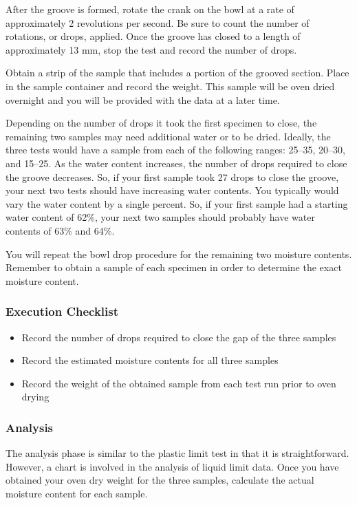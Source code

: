\documentclass[12pt]{article}
\begin{document}
After the groove is formed, rotate the crank on the bowl at a rate of approximately 2 revolutions per second. Be sure to count the number of rotations, or drops, applied. Once the groove has closed to a length of approximately 13 mm, stop the test and record the number of drops.

Obtain a strip of the sample that includes a portion of the grooved section. Place in the sample container and record the weight. This sample will be oven dried overnight and you will be provided with the data at a later time.

Depending on the number of drops it took the first specimen to close, the remaining two samples may need additional water or to be dried. Ideally, the three tests would have a sample from each of the following ranges: 25--35, 20--30, and 15--25. As the water content increases, the number of drops required to close the groove decreases. So, if your first sample took 27 drops to close the groove, your next two tests should have increasing water contents. You typically would vary the water content by a single percent. So, if your first sample had a starting water content of 62\%, your next two samples should probably have water contents of 63\% and 64\%.

You will repeat the bowl drop procedure for the remaining two moisture contents. Remember to obtain a sample of each specimen in order to determine the exact moisture content.

\subsubsection*{Execution Checklist}
\begin{itemize}
    \item Record the number of drops required to close the gap of the three samples
    \item Record the estimated moisture contents for all three samples
    \item Record the weight of the obtained sample from each test run prior to oven drying
\end{itemize}

\subsubsection{Analysis}
The analysis phase is similar to the plastic limit test in that it is straightforward. However, a chart is involved in the analysis of liquid limit data. Once you have obtained your oven dry weight for the three samples, calculate the actual moisture content for each sample.
\end{document}
